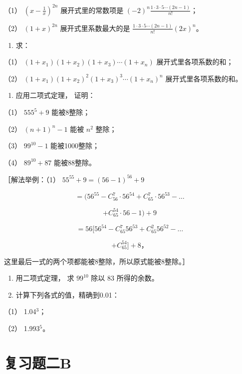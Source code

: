 （1） \(\left(x - \frac{1}{x}\right)^{2n}\) 展开式里的常数项是
\((-2)^{n}\frac{1\cdot 3\cdot 5\cdots(2n - 1)}{n!}\)；

（2） \((1 + x)^{2n}\) 展开式里系数最大的是
\(\frac{1 \cdot 3 \cdot 5 \cdots (2n - 1)}{n!} (2x)^n\)。

\begin{enumerate}[start=7]
\item
  求：
\end{enumerate}

（1） \((1 + x_{1})(1 + x_{2})(1 + x_{3})\cdots (1 + x_{n})\)
展开式里各项系数的和；

（2）
\((1 + x_{1})(1 + x_{2})^{2}(1 + x_{3})^{3}\cdots (1 + x_{n})^{n}\)
展开式里各项系数的和。

\begin{enumerate}[start=8]
\item
  应用二项式定理， 证明：
\end{enumerate}

（1） \(555^{5}+9\) 能被8整除；

（2） \((n + 1)^{n} - 1\) 能被 \(n^2\) 整除；

（3） \(99^{10} - 1\) 能被1000整除；

（4） \(89^{10} + 87\) 能被88整除。

［解法举例：（1） \(55^{55}+9=(56-1)^{56}+9\)

\[
= (56 ^ {55} - C _ {56} ^ {7} \cdot 56 ^ {54} + C _ {65} ^ {7} \cdot 56 ^ {53} - \dots
\]

\[
+ C _ {65} ^ {54} \cdot 56 - 1) + 9
\]

\[
= 56 [ 56 ^ {54} - C _ {65} ^ {7} 56 ^ {53} + C _ {65} ^ {2} 56 ^ {52} - \dots
\]

\[
+ C _ {65} ^ {54} ] + 8\text{，}
\]

这里最后一式的两个项都能被8整除，所以原式能被8整除。］

\begin{enumerate}[start=9]
\item
  用二项式定理， 求 \(99^{10}\) 除以 83 所得的余数。
\item
  计算下列各式的值，精确到0.01：
\end{enumerate}

（1） 1.04\(^{3}\)；

（2） 1.993\(^{5}\)。

\section{复习题二B}


